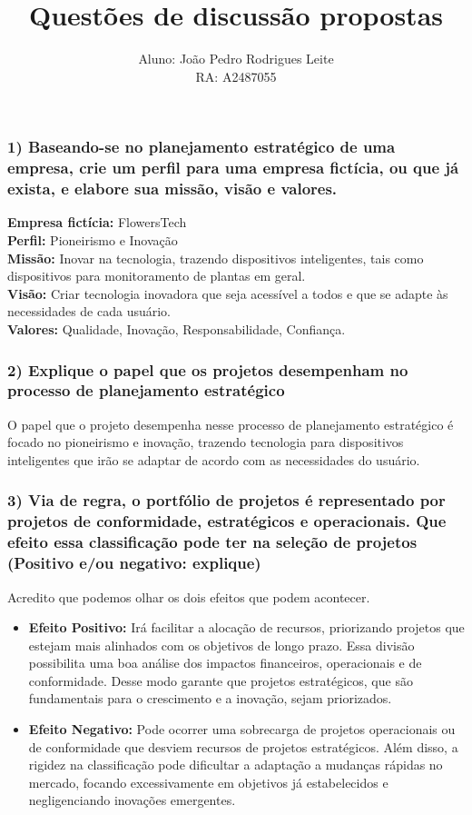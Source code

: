 \documentclass{article}
\title{Questões de discussão propostas}
\author{Aluno: João Pedro Rodrigues Leite \\ RA: A2487055}
\date{}
\begin{document}
	
	\maketitle

	\subsubsection*{1) Baseando-se no planejamento estratégico de uma empresa, crie um perfil para uma empresa fictícia, ou que já exista, e elabore sua missão, visão e valores.}
	
	\textbf{Empresa fictícia:} FlowersTech \\
	\textbf{Perfil:} Pioneirismo e Inovação \\
	\textbf{Missão:} Inovar na tecnologia, trazendo dispositivos inteligentes, tais como dispositivos para monitoramento de plantas em geral. \\
	\textbf{Visão:} Criar tecnologia inovadora que seja acessível a todos e que se adapte às necessidades de cada usuário. \\
	\textbf{Valores:} Qualidade, Inovação, Responsabilidade, Confiança.
	
	\subsubsection*{2) Explique o papel que os projetos desempenham no processo de planejamento estratégico}
	
	O papel que o projeto desempenha nesse processo de planejamento estratégico é focado no pioneirismo e inovação, trazendo tecnologia para dispositivos inteligentes que irão se adaptar de acordo com as necessidades do usuário.
	
	\subsubsection*{3) Via de regra, o portfólio de projetos é representado por projetos de conformidade, estratégicos e operacionais. Que efeito essa classificação pode ter na seleção de projetos (Positivo e/ou negativo: explique)}
	
	Acredito que podemos olhar os dois efeitos que podem acontecer.
	
	\begin{itemize}
		\item \textbf{Efeito Positivo:} Irá facilitar a alocação de recursos, priorizando projetos que estejam mais alinhados com os objetivos de longo prazo. Essa divisão possibilita uma boa análise dos impactos financeiros, operacionais e de conformidade. Desse modo garante que projetos estratégicos, que são fundamentais para o crescimento e a inovação, sejam priorizados.
		
		\item \textbf{Efeito Negativo:} Pode ocorrer uma sobrecarga de projetos operacionais ou de conformidade que desviem recursos de projetos estratégicos. Além disso, a rigidez na classificação pode dificultar a adaptação a mudanças rápidas no mercado, focando excessivamente em objetivos já estabelecidos e negligenciando inovações emergentes.
	\end{itemize}
	
\end{document}
